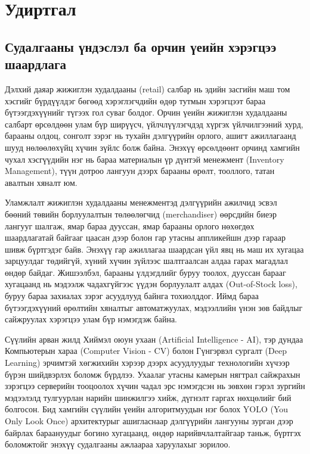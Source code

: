 \chapter{Удиртгал}

\section{Судалгааны үндэслэл ба орчин үеийн хэрэгцээ шаардлага}
Дэлхий даяар жижиглэн худалдааны (retail) салбар нь эдийн засгийн маш том хэсгийг бүрдүүлдэг бөгөөд хэрэглэгчдийн өдөр тутмын хэрэгцээт бараа бүтээгдэхүүнийг түгээх гол суваг болдог. Орчин үеийн жижиглэн худалдааны салбарт өрсөлдөөн улам бүр ширүүсч, үйлчлүүлэгчдэд хүргэх үйлчилгээний хурд, барааны олдоц, сонголт зэрэг нь тухайн дэлгүүрийн орлого, ашигт ажиллагаанд шууд нөлөөлөхүйц хүчин зүйлс болж байна. Энэхүү өрсөлдөөнт орчинд хамгийн чухал хэсгүүдийн нэг нь бараа материалын үр дүнтэй менежмент (Inventory Management), түүн дотроо лангуун дээрх барааны өрөлт, тооллого, татан авалтын хяналт юм.

Уламжлалт жижиглэн худалдааны менежментэд дэлгүүрийн ажилчид эсвэл бөөний төвийн борлуулалтын төлөөлөгчид (merchandiser) өөрсдийн биеэр лангууг шалгаж, ямар бараа дууссан, ямар барааны орлого нөхөгдөх шаардлагатай байгааг цаасан дээр болон гар утасны аппликейшн дээр гараар шивж бүртгэдэг байв. Энэхүү гар ажиллагаа шаардсан үйл явц нь маш их хугацаа зарцуулдаг төдийгүй, хүний хүчин зүйлээс шалтгаалсан алдаа гарах магадлал өндөр байдаг. Жишээлбэл, барааны үлдэгдлийг буруу тоолох, дууссан барааг хугацаанд нь мэдээлж чадахгүйгээс үүдэн борлуулалт алдах (Out-of-Stock loss), буруу бараа захиалах зэрэг асуудлууд байнга тохиолддог. Иймд бараа бүтээгдэхүүний өрөлтийн хяналтыг автоматжуулах, мэдээллийн үнэн зөв байдлыг сайжруулах хэрэгцээ улам бүр нэмэгдэж байна.

Сүүлийн арван жилд Хиймэл оюун ухаан (Artificial Intelligence - AI), тэр дундаа Компьютерын хараа (Computer Vision - CV) болон Гүнгэрвэл сургалт (Deep Learning) эрчимтэй хөгжихийн хэрээр дээрх асуудлуудыг технологийн хүчээр бүрэн шийдвэрлэх боломж бүрдлээ. Ухаалаг утасны камерын нягтрал сайжрахын зэрэгцээ серверийн тооцоолох хүчин чадал эрс нэмэгдсэн нь зөвхөн гэрэл зургийн мэдээлэлд тулгуурлан нарийн шинжилгээ хийж, дүгнэлт гаргах нөхцөлийг бий болгосон. Бид хамгийн сүүлийн үеийн алгоритмуудын нэг болох YOLO (You Only Look Once) архитектурыг ашигласнаар дэлгүүрийн лангууны зурган дээр байрлах бараануудыг богино хугацаанд, өндөр нарийвчлалтайгаар таньж, бүртгэх боломжтойг энэхүү судалгааны ажлаараа харуулахыг зорилоо. 

